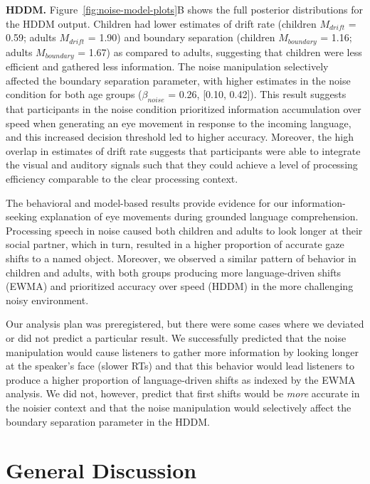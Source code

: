 \documentclass[,man,floatsintext]{apa6}
\begin{document}
\textbf{HDDM.} Figure~\ref{fig:noise-model-plots}B shows the full
posterior distributions for the HDDM output. Children had lower
estimates of drift rate (children \(M_{drift}\) = 0.59; adults
\(M_{drift}\) = 1.90) and boundary separation (children \(M_{boundary}\)
= 1.16; adults \(M_{boundary}\) = 1.67) as compared to adults,
suggesting that children were less efficient and gathered less
information. The noise manipulation selectively affected the boundary
separation parameter, with higher estimates in the noise condition for
both age groups (\(\beta_{noise}\) = 0.26, {[}0.10, 0.42{]}). This
result suggests that participants in the noise condition prioritized
information accumulation over speed when generating an eye movement in
response to the incoming language, and this increased decision threshold
led to higher accuracy. Moreover, the high overlap in estimates of drift
rate suggests that participants were able to integrate the visual and
auditory signals such that they could achieve a level of processing
efficiency comparable to the clear processing context.

The behavioral and model-based results provide evidence for our
information-seeking explanation of eye movements during grounded
language comprehension. Processing speech in noise caused both children
and adults to look longer at their social partner, which in turn,
resulted in a higher proportion of accurate gaze shifts to a named
object. Moreover, we observed a similar pattern of behavior in children
and adults, with both groups producing more language-driven shifts
(EWMA) and prioritized accuracy over speed (HDDM) in the more
challenging noisy environment.

Our analysis plan was preregistered, but there were some cases where we
deviated or did not predict a particular result. We successfully
predicted that the noise manipulation would cause listeners to gather
more information by looking longer at the speaker's face (slower RTs)
and that this behavior would lead listeners to produce a higher
proportion of language-driven shifts as indexed by the EWMA analysis. We
did not, however, predict that first shifts would be \emph{more}
accurate in the noisier context and that the noise manipulation would
selectively affect the boundary separation parameter in the HDDM.

\section{General Discussion}\label{general-discussion}
\end{document}
